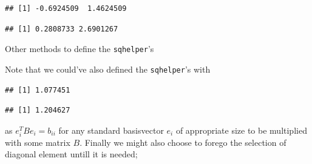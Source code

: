 \documentclass[
]{article}
\newenvironment{Shaded}{\begin{snugshade}}{\end{snugshade}}
\newcommand{\DecValTok}[1]{\textcolor[rgb]{0.00,0.00,0.81}{#1}}
\newcommand{\KeywordTok}[1]{\textcolor[rgb]{0.13,0.29,0.53}{\textbf{#1}}}
\newcommand{\NormalTok}[1]{#1}
\newcommand{\OperatorTok}[1]{\textcolor[rgb]{0.81,0.36,0.00}{\textbf{#1}}}
\newcommand{\StringTok}[1]{\textcolor[rgb]{0.31,0.60,0.02}{#1}}
\begin{document}
\begin{verbatim}
## [1] -0.6924509  1.4624509
\end{verbatim}

\begin{Shaded}
\end{Shaded}

\begin{verbatim}
## [1] 0.2808733 2.6901267
\end{verbatim}

Other methods to define the \texttt{sqhelper}'s

Note that we could've also defined the \texttt{sqhelper}'s with

\begin{Shaded}
\end{Shaded}

\begin{verbatim}
## [1] 1.077451
\end{verbatim}

\begin{Shaded}
\end{Shaded}

\begin{verbatim}
## [1] 1.204627
\end{verbatim}

as \(e_i^TBe_i=b_{ii}\) for any standard basisvector \(e_i\) of
appropriate size to be multiplied with some matrix \(B.\) Finally we
might also choose to forego the selection of diagonal element untill it
is needed;
\end{document}
